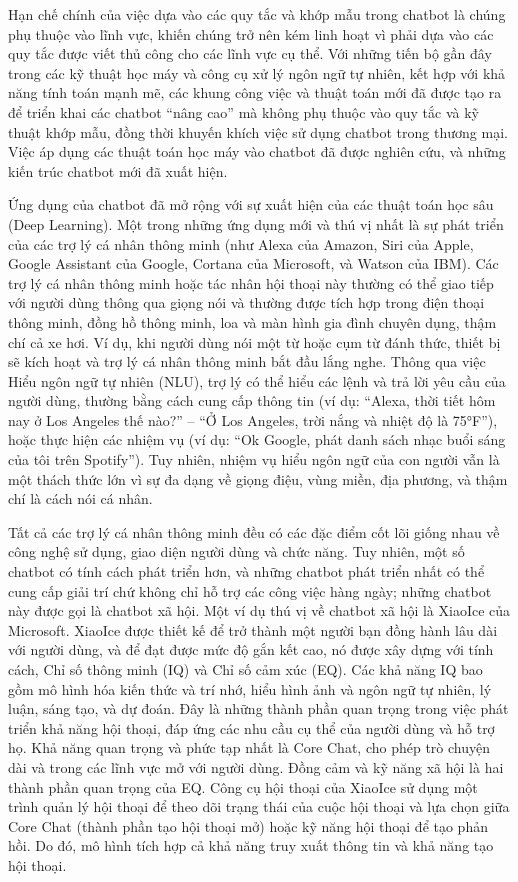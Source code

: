 Hạn chế chính của việc dựa vào các quy tắc và khớp mẫu trong chatbot là chúng phụ thuộc vào lĩnh vực, khiến chúng trở nên kém linh hoạt vì phải dựa vào các quy tắc được viết thủ công cho các lĩnh vực cụ thể. Với những tiến bộ gần đây trong các kỹ thuật học máy và công cụ xử lý ngôn ngữ tự nhiên, kết hợp với khả năng tính toán mạnh mẽ, các khung công việc và thuật toán mới đã được tạo ra để triển khai các chatbot “nâng cao” mà không phụ thuộc vào quy tắc và kỹ thuật khớp mẫu, đồng thời khuyến khích việc sử dụng chatbot trong thương mại. Việc áp dụng các thuật toán học máy vào chatbot đã được nghiên cứu, và những kiến trúc chatbot mới đã xuất hiện.

Ứng dụng của chatbot đã mở rộng với sự xuất hiện của các thuật toán học sâu (Deep Learning). Một trong những ứng dụng mới và thú vị nhất là sự phát triển của các trợ lý cá nhân thông minh (như Alexa của Amazon, Siri của Apple, Google Assistant của Google, Cortana của Microsoft, và Watson của IBM). Các trợ lý cá nhân thông minh hoặc tác nhân hội thoại này thường có thể giao tiếp với người dùng thông qua giọng nói và thường được tích hợp trong điện thoại thông minh, đồng hồ thông minh, loa và màn hình gia đình chuyên dụng, thậm chí cả xe hơi. Ví dụ, khi người dùng nói một từ hoặc cụm từ đánh thức, thiết bị sẽ kích hoạt và trợ lý cá nhân thông minh bắt đầu lắng nghe. Thông qua việc Hiểu ngôn ngữ tự nhiên (NLU), trợ lý có thể hiểu các lệnh và trả lời yêu cầu của người dùng, thường bằng cách cung cấp thông tin (ví dụ: “Alexa, thời tiết hôm nay ở Los Angeles thế nào?” – “Ở Los Angeles, trời nắng và nhiệt độ là 75°F”), hoặc thực hiện các nhiệm vụ (ví dụ: “Ok Google, phát danh sách nhạc buổi sáng của tôi trên Spotify”). Tuy nhiên, nhiệm vụ hiểu ngôn ngữ của con người vẫn là một thách thức lớn vì sự đa dạng về giọng điệu, vùng miền, địa phương, và thậm chí là cách nói cá nhân.

Tất cả các trợ lý cá nhân thông minh đều có các đặc điểm cốt lõi giống nhau về công nghệ sử dụng, giao diện người dùng và chức năng. Tuy nhiên, một số chatbot có tính cách phát triển hơn, và những chatbot phát triển nhất có thể cung cấp giải trí chứ không chỉ hỗ trợ các công việc hàng ngày; những chatbot này được gọi là chatbot xã hội. Một ví dụ thú vị về chatbot xã hội là XiaoIce của Microsoft. XiaoIce được thiết kế để trở thành một người bạn đồng hành lâu dài với người dùng, và để đạt được mức độ gắn kết cao, nó được xây dựng với tính cách, Chỉ số thông minh (IQ) và Chỉ số cảm xúc (EQ). Các khả năng IQ bao gồm mô hình hóa kiến thức và trí nhớ, hiểu hình ảnh và ngôn ngữ tự nhiên, lý luận, sáng tạo, và dự đoán. Đây là những thành phần quan trọng trong việc phát triển khả năng hội thoại, đáp ứng các nhu cầu cụ thể của người dùng và hỗ trợ họ. Khả năng quan trọng và phức tạp nhất là Core Chat, cho phép trò chuyện dài và trong các lĩnh vực mở với người dùng. Đồng cảm và kỹ năng xã hội là hai thành phần quan trọng của EQ. Công cụ hội thoại của XiaoIce sử dụng một trình quản lý hội thoại để theo dõi trạng thái của cuộc hội thoại và lựa chọn giữa Core Chat (thành phần tạo hội thoại mở) hoặc kỹ năng hội thoại để tạo phản hồi. Do đó, mô hình tích hợp cả khả năng truy xuất thông tin và khả năng tạo hội thoại.

